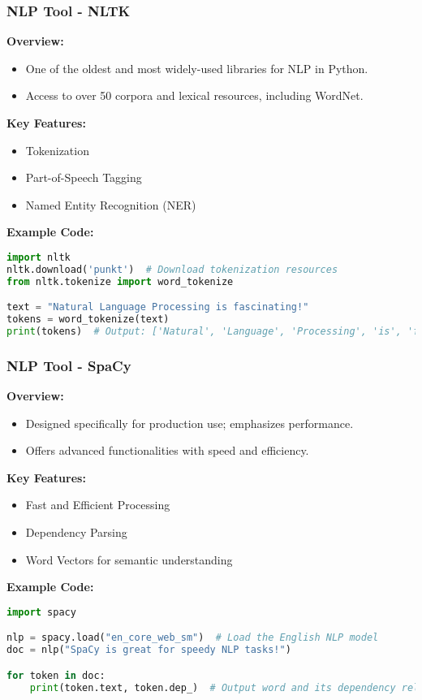 \documentclass[aspectratio=169]{beamer}
\begin{document}
\begin{frame}[fragile]
    \frametitle{NLP Tool - NLTK}
    \textbf{Overview:}
    \begin{itemize}
        \item One of the oldest and most widely-used libraries for NLP in Python.
        \item Access to over 50 corpora and lexical resources, including WordNet.
    \end{itemize}

    \textbf{Key Features:}
    \begin{itemize}
        \item Tokenization
        \item Part-of-Speech Tagging
        \item Named Entity Recognition (NER)
    \end{itemize}
    
    \textbf{Example Code:}
    \begin{lstlisting}[language=Python]
import nltk
nltk.download('punkt')  # Download tokenization resources
from nltk.tokenize import word_tokenize

text = "Natural Language Processing is fascinating!"
tokens = word_tokenize(text)
print(tokens)  # Output: ['Natural', 'Language', 'Processing', 'is', 'fascinating', '!']
    \end{lstlisting}
\end{frame}

\begin{frame}[fragile]
    \frametitle{NLP Tool - SpaCy}
    \textbf{Overview:}
    \begin{itemize}
        \item Designed specifically for production use; emphasizes performance.
        \item Offers advanced functionalities with speed and efficiency.
    \end{itemize}

    \textbf{Key Features:}
    \begin{itemize}
        \item Fast and Efficient Processing
        \item Dependency Parsing
        \item Word Vectors for semantic understanding
    \end{itemize}

    \textbf{Example Code:}
    \begin{lstlisting}[language=Python]
import spacy

nlp = spacy.load("en_core_web_sm")  # Load the English NLP model
doc = nlp("SpaCy is great for speedy NLP tasks!")

for token in doc:
    print(token.text, token.dep_)  # Output word and its dependency relation
    \end{lstlisting}
\end{frame}
\end{document}
